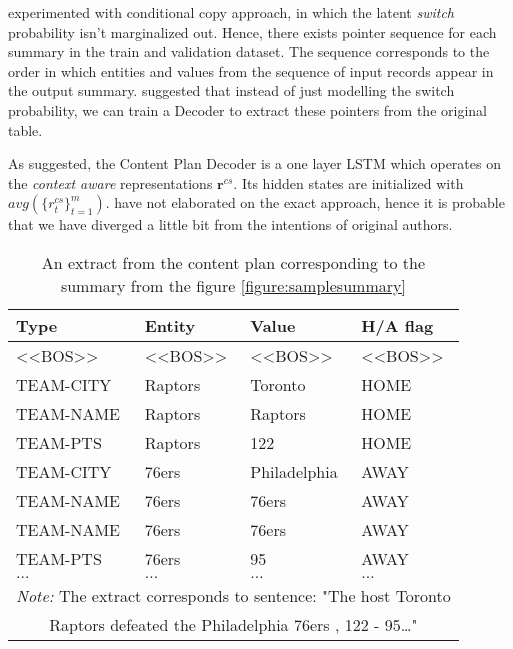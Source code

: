 \citet{wiseman2017} experimented with conditional copy approach, in which the latent \emph{switch} probability isn't marginalized out. Hence, there exists pointer sequence for each summary in the train and validation dataset. The sequence corresponds to the order in which entities and values from the sequence of input records appear in the output summary. \citet{puduppully2019datatotext} suggested that instead of just modelling the switch probability, we can train a Decoder to extract these pointers from the original table.

As suggested, the Content Plan Decoder is a one layer LSTM which operates on the \emph{context aware} representations $\boldsymbol{r}^{cs}$. Its hidden states are initialized with $avg(\{r_t^{cs}\}_{t=1}^m)$. \citet{puduppully2019datatotext} have not elaborated on the exact approach, hence it is probable that we have diverged a little bit from the intentions of original authors.

\begin{table}[h]
    \centering \small
    \begin{tabular}{llll}
        \toprule
        \textbf{Type} & \textbf{Entity} & \textbf{Value} & \textbf{H/A flag} \\                  
        \midrule
        \textless{}\textless{}BOS\textgreater{}\textgreater{} & \textless{}\textless{}BOS\textgreater{}\textgreater{} & \textless{}\textless{}BOS\textgreater{}\textgreater{} & \textless{}\textless{}BOS\textgreater{}\textgreater{} \\
        TEAM-CITY    & Raptors      & Toronto      & HOME                                                  \\
        TEAM-NAME    & Raptors      & Raptors      & HOME                                                  \\
        TEAM-PTS     & Raptors      & 122          & HOME                                                  \\
        TEAM-CITY    & 76ers        & Philadelphia & AWAY                                                  \\
        TEAM-NAME    & 76ers        & 76ers        & AWAY                                                  \\
        TEAM-NAME    & 76ers        & 76ers        & AWAY                                                  \\
        TEAM-PTS     & 76ers        & 95           & AWAY                                                  \\
        $\dots$      & $\dots$      & $\dots$      & $\dots$ \\                                        
        \bottomrule
        \multicolumn{4}{c}{\footnotesize \textit{Note:} The extract corresponds to sentence: "The host Toronto} \\
        \multicolumn{4}{c}{\footnotesize Raptors defeated the Philadelphia 76ers , 122 - 95\dots "}
    \end{tabular}
    \caption{An extract from the content plan corresponding to the summary from the figure \ref{figure:samplesummary}}
\end{table}

